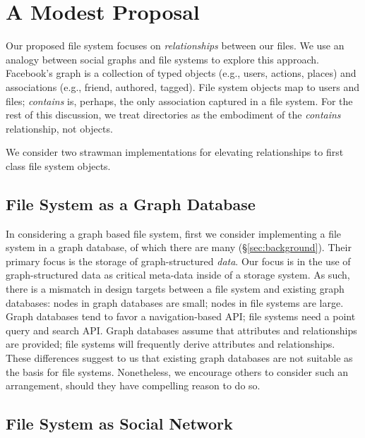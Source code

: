 
\section{A Modest Proposal}\label{sec:graphfs}


Our proposed file system focuses on \textit{relationships} between our files.
We use an analogy between social graphs and file systems to explore this 
approach.
Facebook's graph is a collection of typed objects
(e.g., users, actions, places) and associations (e.g., friend, authored, tagged).
File system objects map to users and files; \textit{contains} is, perhaps, the only
association captured in a file system.
For the rest of this discussion, we treat directories as the embodiment of the
\emph{contains} relationship, not objects.

We consider two strawman implementations for elevating relationships to
first class file system objects.

\subsection{File System as a Graph Database}

In considering a graph based file system, first we consider
implementing a file system in a graph database, of which there are
many (\S \ref{sec:background}). Their primary focus is the storage of 
graph-structured \textit{data}.  Our focus is in the use of graph-structured
data as critical meta-data inside of a storage system.
As such, there is a mismatch in design targets between a file system and
existing graph databases: nodes in graph databases are small; nodes in
file systems are large. Graph databases tend to favor a navigation-based API;
file systems need a point query and search API. Graph databases assume that
attributes and relationships are provided; file systems will frequently derive
attributes and relationships.
These differences suggest to us that existing graph databases are not suitable
as the basis for file systems.
Nonetheless, we encourage others to consider such an arrangement, should they
have compelling reason to do so.

\subsection{File System as Social Network}

